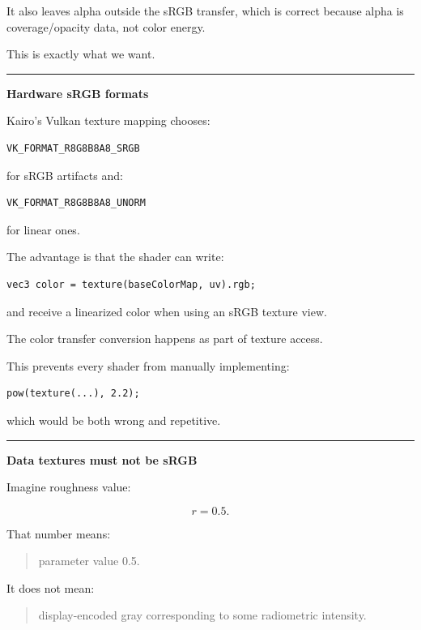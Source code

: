 It also leaves alpha outside the sRGB transfer, which is correct because alpha is coverage/opacity data, not color energy.

This is exactly what we want.

\begin{center}\rule{0.5\linewidth}{0.5pt}\end{center}

\textbf{Hardware sRGB formats}

Kairo's Vulkan texture mapping chooses:

\begin{verbatim}
VK_FORMAT_R8G8B8A8_SRGB
\end{verbatim}

for sRGB artifacts and:

\begin{verbatim}
VK_FORMAT_R8G8B8A8_UNORM
\end{verbatim}

for linear ones.

The advantage is that the shader can write:

\begin{verbatim}
vec3 color = texture(baseColorMap, uv).rgb;
\end{verbatim}

and receive a linearized color when using an sRGB texture view.

The color transfer conversion happens as part of texture access.

This prevents every shader from manually implementing:

\begin{verbatim}
pow(texture(...), 2.2);
\end{verbatim}

which would be both wrong and repetitive.

\begin{center}\rule{0.5\linewidth}{0.5pt}\end{center}

\textbf{Data textures must not be sRGB}

Imagine roughness value:

\[
r=0.5.
\]

That number means:

\begin{quote}
parameter value 0.5.
\end{quote}

It does not mean:

\begin{quote}
display-encoded gray corresponding to some radiometric intensity.
\end{quote}

